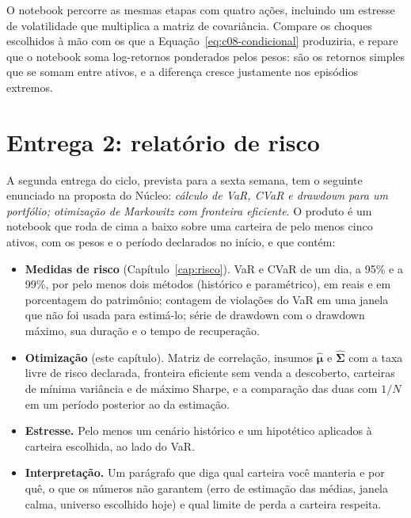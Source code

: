 \begin{repositorio}
O notebook  percorre as mesmas etapas com quatro ações, incluindo um estresse de volatilidade que multiplica a matriz de covariância. Compare os choques escolhidos à mão com os que a Equação~\eqref{eq:c08-condicional} produziria, e repare que o notebook soma log-retornos ponderados pelos pesos: são os retornos simples que se somam entre ativos, e a diferença cresce justamente nos episódios extremos.
\end{repositorio}

\section{Entrega 2: relatório de risco}
\label{sec:c08-entrega}

A segunda entrega do ciclo, prevista para a sexta semana, tem o seguinte enunciado na proposta do Núcleo: \emph{cálculo de VaR, CVaR e drawdown para um portfólio; otimização de Markowitz com fronteira eficiente}. O produto é um notebook que roda de cima a baixo sobre uma carteira de pelo menos cinco ativos, com os pesos e o período declarados no início, e que contém:

\begin{itemize}
  \item \textbf{Medidas de risco} (Capítulo~\ref{cap:risco}). VaR e CVaR de um dia, a 95\% e a 99\%, por pelo menos dois métodos (histórico e paramétrico), em reais e em porcentagem do patrimônio; contagem de violações do VaR em uma janela que não foi usada para estimá-lo; série de drawdown com o drawdown máximo, sua duração e o tempo de recuperação.
  \item \textbf{Otimização} (este capítulo). Matriz de correlação, insumos $\hat{\symbf{\mu}}$ e $\hat{\symbf{\Sigma}}$ com a taxa livre de risco declarada, fronteira eficiente sem venda a descoberto, carteiras de mínima variância e de máximo Sharpe, e a comparação das duas com $1/N$ em um período posterior ao da estimação.
  \item \textbf{Estresse.} Pelo menos um cenário histórico e um hipotético aplicados à carteira escolhida, ao lado do VaR.
  \item \textbf{Interpretação.} Um parágrafo que diga qual carteira você manteria e por quê, o que os números não garantem (erro de estimação das médias, janela calma, universo escolhido hoje) e qual limite de perda a carteira respeita.
\end{itemize}

